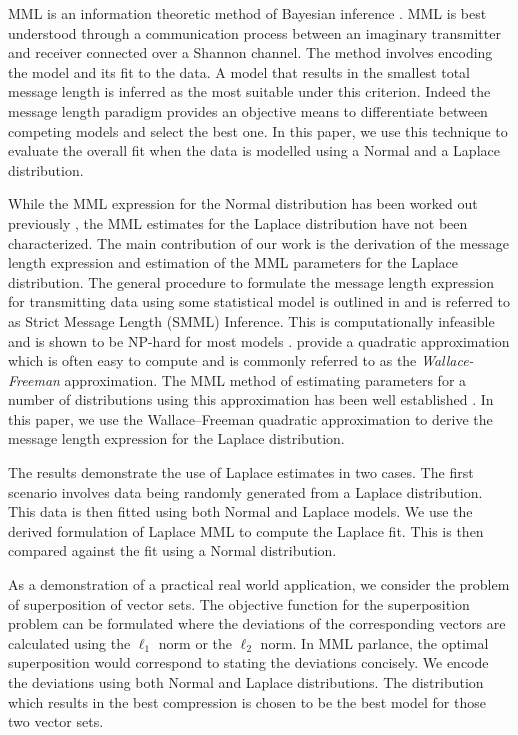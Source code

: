 \documentclass[wcp]{jmlr}
\begin{document}
MML is an information theoretic method of Bayesian inference \citep{wallace68}. MML is best
understood through a communication process between an imaginary transmitter
and receiver connected over a Shannon channel. The method involves
encoding the model and its fit to the data. A model that results in the smallest total message
length is inferred as the most suitable under this criterion. Indeed the message length
paradigm provides an objective means to differentiate between competing models
and select the best one. In this paper, we use this technique to 
evaluate the overall fit when the data is modelled  using a Normal and a Laplace distribution. 

While the MML expression for the Normal distribution has been 
worked out previously \citep{wallace68,WallaceBook}, the MML estimates for the Laplace 
distribution have not been characterized. 
The main contribution of our work is the derivation of the message length 
expression and estimation of the MML parameters for the Laplace distribution.
The general procedure to formulate the message length expression for transmitting
data using some statistical model is outlined in \citet{wallace-75} and is 
referred to as Strict Message Length (SMML) Inference. This is computationally
infeasible and is shown to be NP-hard for most models \citep{Farr01012002}. 
\citet{wallace-87} provide a quadratic approximation which is often easy to compute
and is commonly referred to as the \emph{Wallace-Freeman} approximation. The MML method
of estimating parameters for a number of distributions using this approximation
has been well established \citep{WallaceBook}. In this paper, we use the 
Wallace--Freeman quadratic approximation
to derive the message length expression for the Laplace distribution. 

The results demonstrate the use of Laplace estimates in two cases. 
The first scenario involves data being randomly
generated from a Laplace distribution. This data is then fitted using
both Normal and Laplace models. We use the derived formulation of Laplace MML to
compute the Laplace fit. This is then compared against the fit using a Normal
distribution. 

As a demonstration of a practical real world application, we consider the problem of
superposition of vector sets. The objective function for the superposition problem can be formulated
where the deviations of the corresponding vectors are calculated using the $\ell_1$ norm 
or the $\ell_2$ norm. In MML parlance, the optimal superposition would correspond to stating
the deviations concisely. We encode the deviations using both Normal and Laplace
distributions. The distribution which results in the best compression is chosen
to be the best model for those two vector sets.
\end{document}
